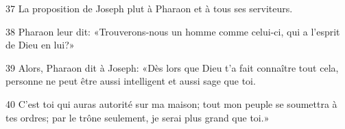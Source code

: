 37 La proposition de Joseph plut à Pharaon et à tous ses serviteurs.

38 Pharaon leur dit: «Trouverons-nous un homme comme celui-ci, qui a l’esprit de Dieu en lui?»

39 Alors, Pharaon dit à Joseph: «Dès lors que Dieu t’a fait connaître tout cela, personne ne peut être aussi intelligent et aussi sage que toi.

40 C’est toi qui auras autorité sur ma maison; tout mon peuple se soumettra à tes ordres; par le trône seulement, je serai plus grand que toi.»
